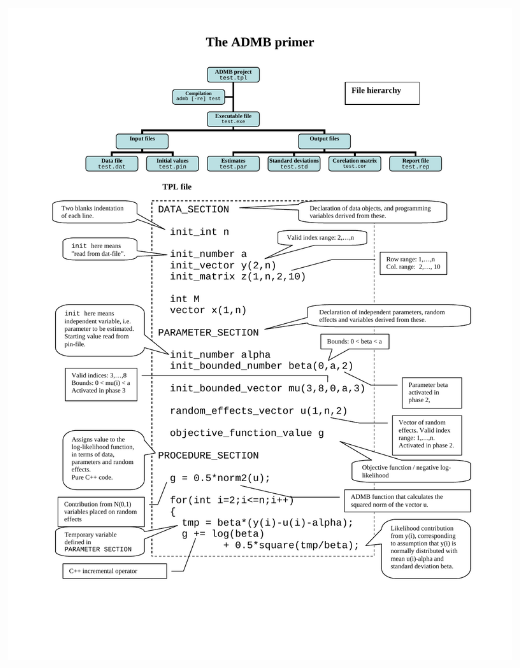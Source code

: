 \documentclass{admbmanual}
\begin{document}
\hskip-2pc\includegraphics[width=18cm]{ADMBprim.pdf}%


 



\printindex
\end{document}
